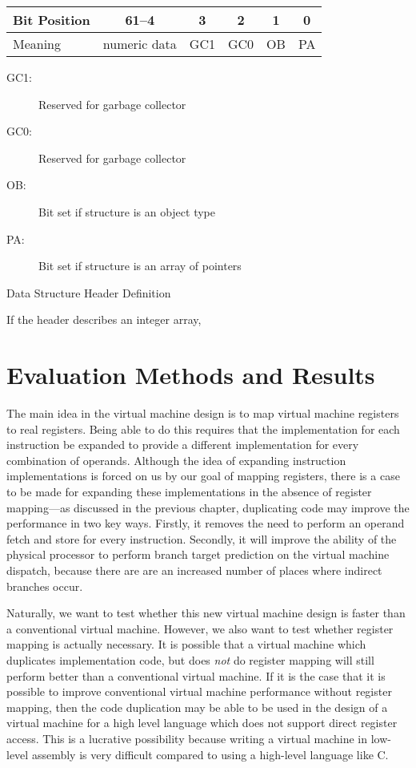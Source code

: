 		\begin{myfigure}
			\begin{tabular}{|l|c| c| c|c|c|}
				\hline
				Bit Position & 61--4 & 3 & 2 & 1 & 0 \\
				\hline
				Meaning & numeric data & GC1 & GC0 & OB & PA \\
				\hline
			\end{tabular}
			\newline
			\begin{description}
				\item[GC1:] Reserved for garbage collector
				\item[GC0:] Reserved for garbage collector
				\item[OB:] Bit set if structure is an object type
				\item[PA:] Bit set if structure is an array of pointers
			\end{description}
			
			\caption{Data Structure Header Definition}
			\label{fig:objheader}
		\end{myfigure}
		
		If the header describes an integer array, 

\chapter{Evaluation Methods and Results}
	The main idea in the virtual machine design is to map virtual machine registers to real registers. Being able to do this requires that the implementation for each instruction be expanded to provide a different implementation for every combination of operands. Although the idea of expanding instruction implementations is forced on us by our goal of mapping registers, there is a case to be made for expanding these implementations in the absence of register mapping---as discussed in the previous chapter, duplicating code may improve the performance in two key ways. Firstly, it removes the need to perform an operand fetch and store for every instruction. Secondly, it will improve the ability of the physical processor to perform branch target prediction on the virtual machine dispatch, because there are are an increased number of places where indirect branches occur.
	
	Naturally, we want to test whether this new virtual machine design is faster than a conventional virtual machine. However, we also want to test whether register mapping is actually necessary. It is possible that a virtual machine which duplicates implementation code, but does \emph{not} do register mapping will still perform better than a conventional virtual machine. If it is the case that it is possible to improve conventional virtual machine performance without register mapping, then the code duplication may be able to be used in the design of a virtual machine for a high level language which does not support direct register access. This is a lucrative possibility because writing a virtual machine in low-level assembly is very difficult compared to using a high-level language like C.
	
